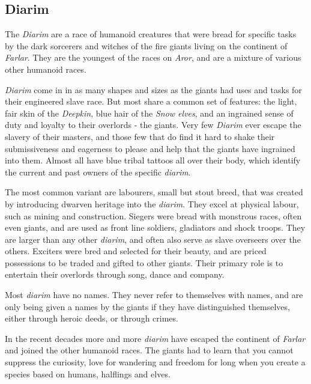\subsection*{Diarim}


The \emph{Diarim} are a race of humanoid creatures that were bread for
specific tasks by the dark sorcerers and witches of the fire giants living on
the continent of \emph{Farlar}. They are the youngest of the races
on \emph{Aror}, and are a mixture of various other humanoid races.

\emph{Diarim} come in in as many shapes and sizes as the giants had uses and
tasks for their engineered slave race. But most share a common set of features:
the light, fair skin of the \emph{Deepkin}, blue hair of the \emph{Snow elves},
and an ingrained sense of duty and loyalty to their overlords - the giants. Very
few \emph{Diarim} ever escape the slavery of their masters, and those few that
do find it hard to shake their submissiveness and eagerness to please and help
that the giants have ingrained into them. Almost all have blue tribal tattoos
all over their body, which identify the current and past owners of the specific
\emph{diarim}.

The most common variant are labourers, small but stout breed, that was created
by introducing dwarven heritage into the \emph{diarim}. They excel at physical
labour, such as mining and construction. Siegers were bread with monstrous
races, often even giants, and are used as front line soldiers, gladiators and
shock troops. They are larger than any other \emph{diarim}, and often also
serve as slave overseers over the others. Exciters were bred and selected for
their beauty, and are priced possessions to be traded and gifted to other
giants. Their primary role is to entertain their overlords through song, dance
and company.

Most \emph{diarim} have no names. They never refer to themselves with names,
and are only being given a names by the giants if they have distinguished
themselves, either through heroic deeds, or through crimes.

In the recent decades more and more \emph{diarim} have escaped the continent
of \emph{Farlar} and joined the other humanoid races. The giants had to learn
that you cannot suppress the curiosity, love for wandering and freedom for long
when you create a species based on humans, halflings and elves.


